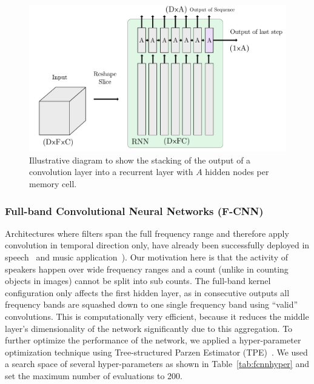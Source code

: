 \begin{figure}[t]
\centering
\includegraphics[width=\columnwidth]{Chapters/08_Analysis_CountNet/figures/crnn.pdf}
\caption{Illustrative diagram to show the stacking of the output of a convolution layer into a recurrent layer with \(A\) hidden nodes per memory cell.}%
\label{fig:crnn}
\end{figure}

\subsubsection{Full-band Convolutional Neural Networks (F-CNN)}%
Architectures where filters span the full frequency range and therefore apply convolution in temporal direction only, have already been successfully deployed in speech~\cite{amodei16} and music application~\cite{Choi17, pons16, Dieleman14}).
Our motivation here is that the activity of speakers happen over wide frequency ranges and a count (unlike in counting objects in images) cannot be split into sub counts.
The full-band kernel configuration only affects the first hidden layer, as in consecutive outputs all frequency bands are squashed down to one single frequency band using ``valid'' convolutions.
This is computationally very efficient, because it reduces the middle layer's dimensionality of the network significantly due to this aggregation.
To further optimize the performance of the network, we applied a hyper-parameter optimization technique using Tree-structured Parzen Estimator (TPE)~\cite{bergstra11}.
We used a search space of several hyper-parameters as shown in Table~\ref{tab:fcnnhyper} and set the maximum number of evaluations to 200.

